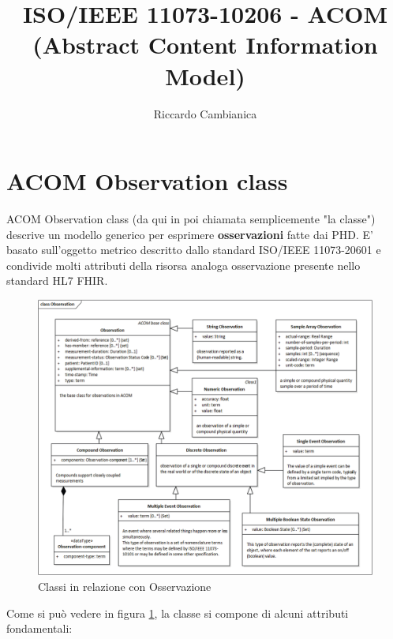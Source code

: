 \documentclass{article}
\title{ISO/IEEE 11073-10206 - ACOM (Abstract Content Information Model)}
\author{Riccardo Cambianica}
\begin{document}
    \maketitle
    \newpage
    \tableofcontents\newpage
    \section{ACOM Observation class}
        ACOM Observation class (da qui in poi chiamata semplicemente "la classe") descrive un modello generico per esprimere \textbf{osservazioni} fatte dai PHD. E' basato sull'oggetto metrico descritto dallo standard ISO/IEEE 11073-20601 e condivide molti attributi della risorsa analoga osservazione presente nello standard HL7 FHIR.
        \begin{figure}[H]
            \centering
            \includegraphics[width=1\textwidth]{figures/observation class.png}
            \caption{Classi in relazione con Osservazione}
            \label{fig:observationClass}
        \end{figure}
        Come si può vedere in figura \ref{fig:observationClass}, la classe si compone di alcuni attributi fondamentali: 
        
\end{document}
